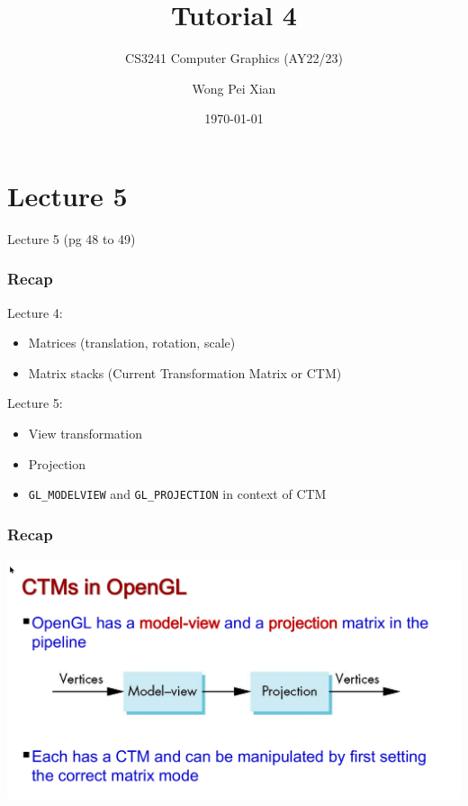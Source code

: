 \documentclass{beamer}
\title{Tutorial 4}
\subtitle{CS3241 Computer Graphics (AY22/23)}
\date{\today}
\author{Wong Pei Xian}
\institute[]{\email{e0389023@u.nus.edu}}
\begin{document}
\frame[plain]{\titlepage}

\section{Lecture 5}

\begin{frame}
    \AlegreyaExtraBold \LARGE
    Lecture 5 (pg 48 to 49)
\end{frame}

\begin{frame}
    \frametitle{Recap}

    Lecture 4:
    \begin{itemize}
        \item Matrices (translation, rotation, scale)
        \item Matrix stacks (Current Transformation Matrix or CTM)
    \end{itemize}

    \vspace{1em}

    Lecture 5:
    \begin{itemize}
        \item View transformation
        \item Projection
        \item \texttt{GL\_MODELVIEW} and \texttt{GL\_PROJECTION} in context of CTM
    \end{itemize}

\end{frame}

\begin{frame}
    \frametitle{Recap}

    \centering
    \includegraphics[scale=0.3]{ctm_opengl.png}

\end{frame}
\end{document}
